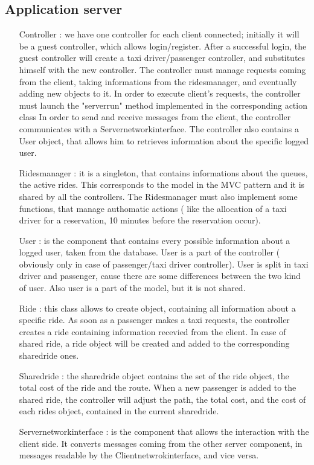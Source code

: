 	\subsection{Application server}
	\begin{itemize}
	 \item [Controller]: we have one controller for each client connected; initially it will be a guest controller,
	 which allows login/register. After a successful login, the guest controller will create a taxi driver/passenger controller,
	 and substitutes himself with the new controller. The controller must manage requests coming from
	 the client, taking informations from the ridesmanager, and eventually adding new objects to it.
	 In order to execute client's requests, the controller must launch the "serverrun" method implemented in the corresponding action class
	 In order to send and receive messages from the client, the controller communicates with a Servernetworkinterface.
	 The controller also contains a User object, that allows him to retrieves information about the specific logged user.
	 \item [Ridesmanager]: it is a singleton, that contains informations about the queues, the active rides. This corresponds 
	 to the model in the MVC pattern and it is shared by all the controllers.
	 The Ridesmanager must also implement some functions, that manage authomatic actions ( like the allocation of a taxi driver for a reservation, 10 minutes before the reservation occur).
	 \item [User]: is the component that contains every possible information about a logged user, taken from the database.
	 User is a part of the controller ( obviously only in case of passenger/taxi driver controller).
	 User is split in taxi driver and passenger, cause there are some differences between the two kind of user.
	 Also user is a part of the model, but it is not shared.
	 \item[Ride]: this class allows to create object, containing all information about a specific ride. 
	 As soon as a passenger makes a taxi requests, the controller creates a ride containing information recevied from the client.
	 In case of shared ride, a ride object will be created and added to the corresponding sharedride ones.
	 \item[Sharedride]: the sharedride object contains the set of the ride object, the total cost of the ride and the route.
	 When a new passenger is added to the shared ride, the controller will adjust the path, the total cost, and the cost of each
	 rides object, contained in the current sharedride.
	 \item[Servernetworkinterface]: is the component that allows the interaction with the client side. It converts messages coming from
	 the other server component, in messages readable by the Clientnetwrokinterface, and vice versa.
	\end{itemize}
